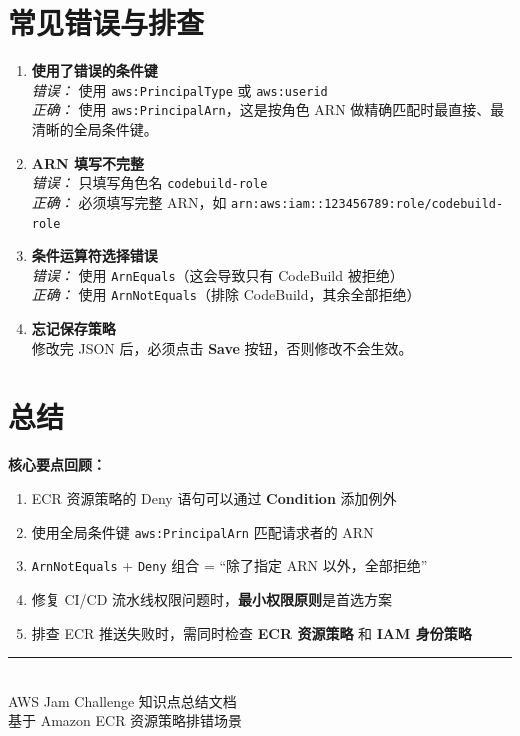 \documentclass[12pt, a4paper]{article}
\begin{document}
\section{常见错误与排查}

\begin{enumerate}[leftmargin=*, label=\textbf{Q\arabic*.}]

  \item \textbf{使用了错误的条件键}\\
  \textit{错误：} 使用 \texttt{aws:PrincipalType} 或 \texttt{aws:userid}\\
  \textit{正确：} 使用 \texttt{aws:PrincipalArn}，这是按角色 ARN 做精确匹配时最直接、最清晰的全局条件键。

  \item \textbf{ARN 填写不完整}\\
  \textit{错误：} 只填写角色名 \texttt{codebuild-role}\\
  \textit{正确：} 必须填写完整 ARN，如 \texttt{arn:aws:iam::123456789:role/codebuild-role}

  \item \textbf{条件运算符选择错误}\\
  \textit{错误：} 使用 \texttt{ArnEquals}（这会导致只有 CodeBuild 被拒绝）\\
  \textit{正确：} 使用 \texttt{ArnNotEquals}（排除 CodeBuild，其余全部拒绝）

  \item \textbf{忘记保存策略}\\
  修改完 JSON 后，必须点击 \textbf{Save} 按钮，否则修改不会生效。

\end{enumerate}

\section{总结}

\begin{successbox}
  \textbf{核心要点回顾：}
  \begin{enumerate}
    \item ECR 资源策略的 Deny 语句可以通过 \textbf{Condition} 添加例外
    \item 使用全局条件键 \texttt{aws:PrincipalArn} 匹配请求者的 ARN
    \item \texttt{ArnNotEquals} + \texttt{Deny} 组合 = ``除了指定 ARN 以外，全部拒绝''
    \item 修复 CI/CD 流水线权限问题时，\textbf{最小权限原则}是首选方案
    \item 排查 ECR 推送失败时，需同时检查 \textbf{ECR 资源策略} 和 \textbf{IAM 身份策略}
  \end{enumerate}
\end{successbox}

\vspace{1cm}
\begin{center}
  \rule{0.4\textwidth}{0.5pt}\\
  \vspace{0.3cm}
  {\small AWS Jam Challenge 知识点总结文档}\\
  {\small 基于 Amazon ECR 资源策略排错场景}
\end{center}
\end{document}
